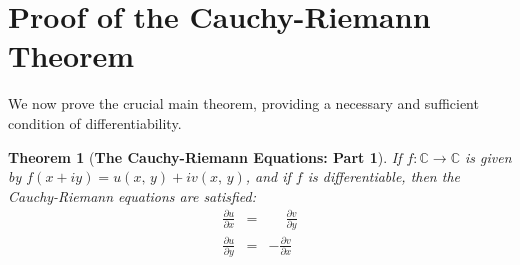 \documentclass{article}
\newtheorem{theorem}{Theorem}[section]
\theoremstyle{definition}
\begin{document}
    \section{Proof of the Cauchy-Riemann Theorem}
        We now prove the crucial main theorem, providing a necessary and
        sufficient condition of differentiability.
        \begin{theorem}[\textbf{The Cauchy-Riemann Equations: Part 1}]
            If $f:\mathbb{C}\rightarrow\mathbb{C}$ is given by
            $f(x+iy)=u(x,\,y)+iv(x,\,y)$, and if $f$ is differentiable, then
            the Cauchy-Riemann equations are satisfied:
            \begin{equation}
                \begin{array}{rcl}
                    \displaystyle
                    \frac{\partial{u}}{\partial{x}}
                    &=&
                    \displaystyle
                    \phantom{+}
                    \frac{\partial{v}}{\partial{y}}\\[1.5em]
                    \displaystyle
                    \frac{\partial{u}}{\partial{y}}
                    &=&
                    \displaystyle
                    -\frac{\partial{v}}{\partial{x}}
                \end{array}
            \end{equation}
        \end{theorem}
\end{document}
